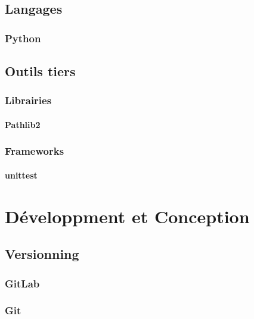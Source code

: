 \documentclass{article}
\begin{document}
\subsection{Langages}

\subsubsection{Python}

\subsection{Outils tiers}

\subsubsection{Librairies}

\paragraph{Pathlib2}

\subsubsection{Frameworks}

\paragraph{unittest}

\newpage


\section{Développment et Conception}

\subsection{Versionning}

\subsubsection{GitLab}

\subsubsection{Git}
\end{document}
